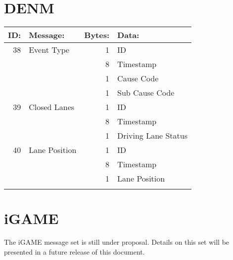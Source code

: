 \documentclass[11pt]{article}
\begin{document}
\section{DENM}
\label{sec:orgheadline11}

\begin{center}
\begin{tabular}{rlrl}
ID: & Message: & Bytes: & Data:\\
\hline
38 & Event Type & 1 & ID\\
 &  & 8 & Timestamp\\
 &  & 1 & Cause Code\\
 &  & 1 & Sub Cause Code\\
\hline
39 & Closed Lanes & 1 & ID\\
 &  & 8 & Timestamp\\
 &  & 1 & Driving Lane Status\\
\hline
40 & Lane Position & 1 & ID\\
 &  & 8 & Timestamp\\
 &  & 1 & Lane Position\\
 &  &  & \\
\end{tabular}
\end{center}


\section{iGAME}
\label{sec:orgheadline12}
The iGAME message set is still under proposal. Details on this set
will be presented in a future release of this document.
\end{document}
